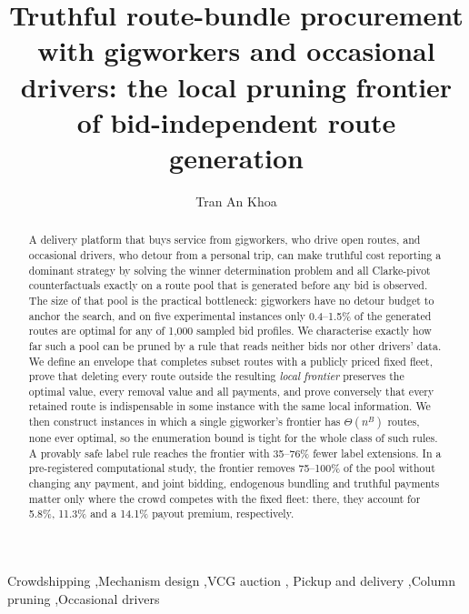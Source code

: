 \documentclass[review,12pt]{elsarticle}
\theoremstyle{definition}
\theoremstyle{remark}
\begin{document}
\begin{frontmatter}

\title{Truthful route-bundle procurement with gigworkers and occasional
drivers: the local pruning frontier of bid-independent route generation}

\author{Tran An Khoa}
\ead{} %
\address{International University, Vietnam National University Ho Chi Minh
City, Ho Chi Minh City, Vietnam} %

\begin{abstract}
A delivery platform that buys service from gigworkers, who drive open
routes, and occasional drivers, who detour from a personal trip, can make
truthful cost reporting a dominant strategy by solving the winner
determination problem and all Clarke-pivot counterfactuals exactly on a
route pool that is generated before any bid is observed. The size of that
pool is the practical bottleneck: gigworkers have no detour budget to anchor
the search, and on five experimental instances only 0.4--1.5\% of the
generated routes are optimal for any of 1,000 sampled bid profiles. We
characterise exactly how far such a pool can be pruned by a rule that reads
neither bids nor other drivers' data. We define an envelope that completes
subset routes with a publicly priced fixed fleet, prove that deleting every
route outside the resulting \emph{local frontier} preserves the optimal
value, every removal value and all payments, and prove conversely that every
retained route is indispensable in some instance with the same local
information. We then construct instances in which a single gigworker's
frontier has $\Theta(n^B)$ routes, none ever optimal, so the enumeration
bound is tight for the whole class of such rules. A provably safe label rule
reaches the frontier with 35--76\% fewer label extensions. In a
pre-registered computational study, the frontier removes 75--100\% of the
pool without changing any payment, and joint bidding, endogenous bundling
and truthful payments matter only where the crowd competes with the fixed
fleet: there, they account for 5.8\%, 11.3\% and a 14.1\% payout premium,
respectively.
\end{abstract}

\begin{keyword}
Crowdshipping \sep Mechanism design \sep VCG auction \sep
Pickup and delivery \sep Column pruning \sep Occasional drivers
\end{keyword}

\end{frontmatter}
\end{document}
